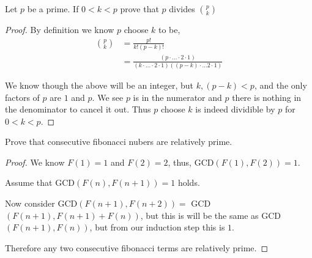 \documentclass[11pt]{article}
\newenvironment{problem}[2][Problem\!]{\begin{trivlist}
\item[\hskip \labelsep {\bfseries #1}\hskip \labelsep {\bfseries #2}]}{\end{trivlist}}
\begin{document}
\begin{tcolorbox}
    \begin{problem} {OC | 11/08 | 82.}
        Let $p$ be a prime. If $0 < k < p$ prove that $p$ divides $\binom{p}{k} $
    \end{problem}
\end{tcolorbox}
\begin{proof}
    By definition we know $p$ choose $k$ to be,
    \begin{align*}
        \binom{p}{k} &= \frac{p!}{k!(p-k)!} \\
        &= \frac{(p\cdot  \dots \cdot 2 \cdot 1)}{ (k\cdot  \dots \cdot 2\cdot 1)((p-k)\cdot \dots 2 \cdot 1)}
    \end{align*}

    We know though the above will be an integer, but $k, (p-k) < p$, and the only factors of $p$ are $1$ and $p$. We see $p$ is in the numerator and $p$ there is nothing in the denominator to cancel it out. Thus $p$ choose $k$ is indeed dividible by $p$ for $0 < k < p$.
\end{proof}

\begin{tcolorbox}
    \begin{problem} {OC | 11/08 | 83.}
        Prove that consecutive fibonacci nubers are relatively prime.
    \end{problem}
\end{tcolorbox}
\begin{proof}
    We know $F(1) = 1$ and $F(2) = 2$, thus, GCD$(F(1), F(2)) = 1$. 
    
    Assume that GCD$(F(n), F(n+1)) = 1$ holds.
    
    Now consider GCD$(F(n+1), F(n+2)) = $ GCD$(F(n+1), F(n+1) + F(n))$, but this is will be the same as GCD$(F(n+1), F(n))$, but from our induction step this is $1$.

    Therefore any two consecutive fibonacci terms are relatively prime.
\end{proof}
\end{document}
